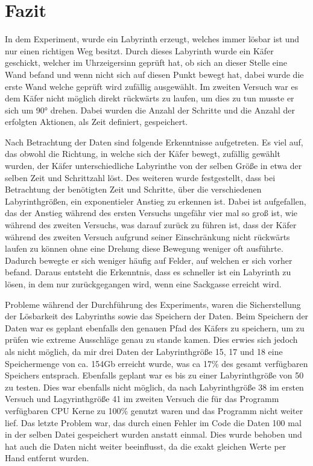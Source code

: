 \documentclass[12pt, a4paper, titlepage]{article}
\begin{document}
\section{Fazit}

In dem Experiment, wurde ein Labyrinth erzeugt, welches immer lösbar ist und nur einen richtigen Weg besitzt.
Durch dieses Labyrinth wurde ein Käfer geschickt, welcher im Uhrzeigersinn geprüft hat, ob sich an dieser Stelle eine Wand befand und wenn nicht sich auf diesen Punkt bewegt hat, dabei wurde die erste Wand welche geprüft wird zufällig ausgewählt.
Im zweiten Versuch war es dem Käfer nicht möglich direkt rückwärts zu laufen, um dies zu tun musste er sich um 90° drehen.
Dabei wurden die Anzahl der Schritte und die Anzahl der erfolgten Aktionen, als Zeit definiert, gespeichert.


\bigskip

Nach Betrachtung der Daten sind folgende Erkenntnisse aufgetreten.
Es viel auf, das obwohl die Richtung, in welche sich der Käfer bewegt, zufällig gewählt wurden, der Käfer unterschiedliche Labyrinthe von der selben Größe in etwa der selben Zeit und Schrittzahl löst.
Des weiteren wurde festgestellt, dass bei Betrachtung der benötigten Zeit und Schritte, über die verschiedenen Labyrinthgrößen, ein exponentieler Anstieg zu erkennen ist.
Dabei ist aufgefallen, das der Anstieg während des ersten Versuchs ungefähr vier mal so groß ist, wie während des zweiten Versuchs, was darauf zurück zu führen ist, dass der Käfer während des zweiten Versuch aufgrund seiner Einschränkung nicht rückwärts laufen zu können ohne eine Drehung diese Bewegung weniger oft ausführte.
Dadurch bewegte er sich weniger häufig auf Felder, auf welchen er sich vorher befand.
Daraus entsteht die Erkenntnis, dass es schneller ist ein Labyrinth zu lösen, in dem nur zurückgegangen wird, wenn eine Sackgasse erreicht wird.

\bigskip

Probleme während der Durchführung des Experiments, waren die Sicherstellung der Lösbarkeit des Labyrinths sowie das Speichern der Daten.
Beim Speichern der Daten war es geplant ebenfalls den genauen Pfad des Käfers zu speichern, um zu prüfen wie extreme Ausschläge genau zu stande kamen.
Dies erwies sich jedoch als nicht möglich, da mir drei Daten der Labyrinthgröße 15, 17 und 18 eine Speichermenge von ca. 154Gb erreicht wurde, was ca 17\% des gesamt verfügbaren Speichers entsprach.
Ebenfalls geplant war es bis zu einer Labyrinthgröße von 50 zu testen.
Dies war ebenfalls nicht möglich, da nach Labyrinthgröße 38 im ersten Versuch und Lagyrinthgröße 41 im zweiten Versuch die für das Programm verfügbaren CPU Kerne zu 100\% genutzt waren und das Programm nicht weiter lief.
Das letzte Problem war, das durch einen Fehler im Code die Daten 100 mal in der selben Datei gespeichert wurden anstatt einmal. Dies wurde behoben und hat auch die Daten nicht weiter beeinflusst, da die exakt gleichen Werte per Hand entfernt wurden.

\newpage

\printbibliography 
\end{document}

